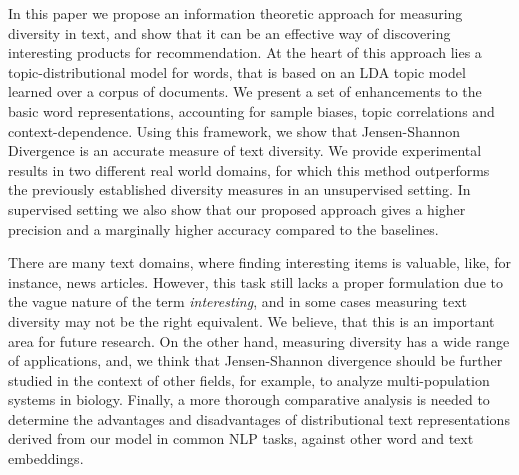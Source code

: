 In this paper we propose an information theoretic approach for
measuring diversity in text, and show that it can be an effective way
of discovering interesting products for recommendation. At the heart
of this approach lies a 
topic-distributional model for words, that is based on an LDA topic
model learned over a corpus of documents. We present a set of
enhancements to the 
basic word representations, accounting for sample
biases, topic correlations and context-dependence. Using this framework,
we show that Jensen-Shannon Divergence is an accurate measure of text
diversity. We provide experimental results in two different real 
world domains, for which this method outperforms the previously
established diversity measures in an unsupervised setting. In
supervised setting we also show that our proposed approach gives a
higher precision and a marginally higher accuracy compared to the
baselines.

There are many text domains, where finding interesting items is valuable, 
like, for instance, news articles. However, this task still lacks a
proper formulation due to the vague nature of the term {\em
interesting}, and in some cases measuring text diversity may not be
the right equivalent. We believe, that this is an important area for
future research. On the other hand, measuring diversity has a
wide range of applications, and, we think that Jensen-Shannon 
divergence should be further studied in the context of other
fields, for example, to analyze multi-population systems in
biology. Finally, a more thorough comparative analysis  
is needed to determine the advantages and disadvantages of
distributional text representations derived from our model in common
NLP tasks, against other word and text embeddings.

 